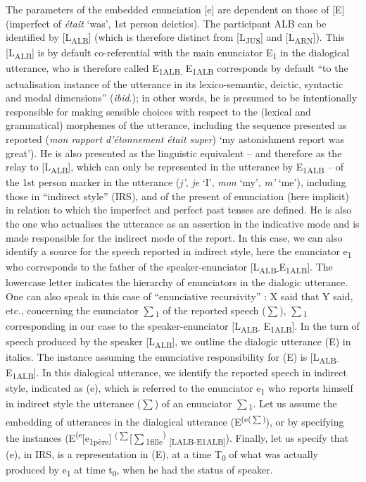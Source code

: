 \documentclass[output=paper]{langscibook}
\begin{document}
The parameters of the embedded enunciation [e] are dependent on those of [E] (imperfect of \textit{était} ‘was’, 1st person deictics). The participant ALB can be identified by [L\textsubscript{ALB}] (which is therefore distinct from [L\textsubscript{JUS}] and [L\textsubscript{ARN}]). This [L\textsubscript{ALB}] is by default co-referential with the main enunciator E\textsubscript{1} in the dialogical utterance, who is therefore called E\textsubscript{1ALB.} E\textsubscript{1ALB} corresponds by default “to the actualisation instance of the utterance in its lexico-semantic, deictic, syntactic and modal dimensions” (\textit{ibid}.); in other words, he is presumed to be intentionally responsible for making sensible choices with respect to the (lexical and grammatical) morphemes of the utterance, including the sequence presented as reported (\textit{mon rapport d’étonnement était super}) ‘my astonishment report was great’). He is also presented as the linguistic equivalent -- and therefore as the relay to [L\textsubscript{ALB}], which can only be represented in the utterance by E\textsubscript{1ALB} -- of the 1st person marker in the utterance (\textit{j'}, \textit{je} ‘I’, \textit{mon} ‘my’, \textit{m'} ‘me’), including those in “indirect style” (IRS), and of the present of enunciation (here implicit) in relation to which the imperfect and perfect past tenses are defined. He is also the one who actualises the utterance as an assertion in the indicative mode and is made responsible for the indirect mode of the report. In this case, we can also identify a source for the speech reported in indirect style, here the enunciator e\textsubscript{1} who corresponds to the father of the speaker-enunciator [L\textsubscript{ALB-}E\textsubscript{1ALB}]. The lowercase letter indicates the hierarchy of enunciators in the dialogic utterance. One can also speak in this case of “enunciative recursivity” \citep{Rosier2008}: X said that Y said, etc., concerning the enunciator\textsubscript{} ${\sum}$\textsubscript{1} of\textsubscript{} the reported speech (${\sum}$), ${\sum}$\textsubscript{1} corresponding in our case to the speaker-enunciator [L\textsubscript{ALB-} E\textsubscript{1ALB}]. In the turn of speech produced by the speaker [L\textsubscript{ALB}], we outline the dialogic utterance (E) in italics. The instance assuming the enunciative responsibility for (E) is [L\textsubscript{ALB-}E\textsubscript{1ALB}]. In this dialogical utterance, we identify the reported speech in indirect style, indicated as (e), which is referred to {the}{ enunciator e\textsubscript{1} who}{} {reports himself} {in}{ indirect style the utterance (${\sum}$) of an enunciator ${\sum}$\textsubscript{1}. Let us assume the embedding of utterances in the dialogical utterance (E\textsuperscript{(e(${\sum}$)}), or by specifying the instances (E\textsuperscript{(e}[e\textsubscript{1p}\textsubscript{è}\textsubscript{re}]\textsuperscript{ (${\sum}$}[${\sum}$\textsubscript{1fille}\textsuperscript{)} \textsubscript{[LALB-E1ALB]}). Finally, let us specify that (e), in IRS, is a representation in (E), at a time T\textsubscript{0} of what was actually produced by e\textsubscript{1} at time t\textsubscript{0}, when he had the status of speaker.}
\end{document}
